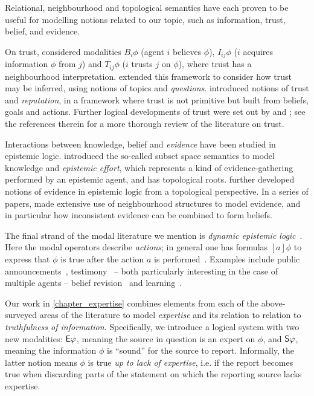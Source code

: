 {

Relational, neighbourhood and topological semantics have each proven to be
useful for modelling notions related to our topic, such as information, trust,
belief, and evidence.

On trust, \textcite{Liau_2003} considered modalities $B_i\phi$ (agent $i$
believes $\phi$), $I_{ij}\phi$ ($i$ acquires information $\phi$ from $j$) and
$T_{ij}\phi$ ($i$ trusts $j$ on $\phi$), where trust has a neighbourhood
interpretation. \textcite{dastani2004inferring} extended this framework to
consider how trust may be inferred, using notions of topics and
\emph{questions}. \textcite{herzig2010logic} introduced notions of trust and
\emph{reputation}, in a framework where trust is not primitive but built from
beliefs, goals and actions. Further logical developments of trust were set out
by \textcite{rodenhauser2014matter} and \textcite{tagliaferri2019logical}; see
the references therein for a more thorough review of the literature on trust.

Interactions between knowledge, belief and \emph{evidence} have been studied in
epistemic logic. \textcite{moss1992topological} introduced the so-called subset
space semantics to model knowledge and \emph{epistemic effort}, which
represents a kind of evidence-gathering performed by an epistemic agent, and
has topological roots. \textcite{ozgun_evidence} further developed notions of
evidence in epistemic logic from a topological perspective. In a series of
papers, \textcite{van2011dynamic,van2012evidence,vanbenthem2014106} made
extensive use of neighbourhood structures to model evidence, and in particular
how inconsistent evidence can be combined to form beliefs.

The final strand of the modal literature we mention is \emph{dynamic epistemic
logic}~\cite{van_Ditmarsch_2008,sep_del}. Here the modal operators describe
\emph{actions}; in general one has formulas $[a]\phi$ to express that $\phi$ is
true after the action $a$ is performed~\cite{sep_del}. Examples include public
announcements~\cite{plaza2007logics}, testimony~\cite{holliday2009dynamic} --
both particularly interesting in the case of multiple agents -- belief
revision~\cite{baltag2008qualitative} and
learning~\cite{gierasimczuk2009bridging,gierasimczuk2010knowing}.

Our work in \cref{chapter_expertise} combines elements from each of the
above-surveyed areas of the literature to model \emph{expertise} and its
relation to relation to \emph{truthfulness of information}. Specifically, we
introduce a logical system with two new modalities: $\E\phi$, meaning the
source in question is an expert on $\phi$, and $\S\phi$, meaning the
information $\phi$ is ``sound'' for the source to report. Informally, the
latter notion means $\phi$ is true \emph{up to lack of expertise}, i.e. if the
report becomes true when discarding parts of the statement on which the
reporting source lacks expertise.

}
